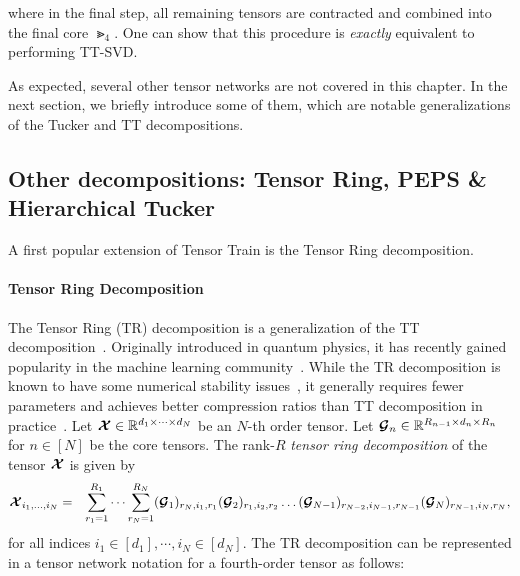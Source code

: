 where in the final step, all remaining tensors are contracted and combined into the final core $\Gt_4$. One can show that this procedure is \emph{exactly} equivalent to performing TT-SVD.

As expected, several other tensor networks are not covered in this chapter. In the next section, we briefly introduce some of them, which are notable generalizations of the Tucker and TT decompositions.
\subsection{Other decompositions: Tensor Ring, PEPS \& Hierarchical Tucker}

A first popular extension of Tensor Train is the Tensor Ring decomposition. 
\paragraph{Tensor Ring Decomposition}
The Tensor Ring (TR) decomposition is a generalization of the TT decomposition~\citep{zhao2016tensor}. Originally introduced in quantum physics, it has recently gained popularity in the machine learning community~\citep{wang2017efficient,wang2018wide,yuan2018higher}. While the TR decomposition is known to have some numerical stability issues~\citep{batselier2018trouble,chen2020tensor}, it generally requires fewer parameters and achieves better compression ratios than TT decomposition in practice~\citep{mickelin2020algorithms}. Let $\bm{\mathcal{X}}\in\mathbb{R}^{d_1\times\dots\times d_N}$
    be an $N$-th order tensor. Let 
    $\bm{\mathcal{G}}_n\in\mathbb{R}^{R_{n-1}\times d_n\times R_n}$ for $n\in[N]$ be the core tensors. 
    The rank-$R$ \emph{tensor ring decomposition} of the tensor $\bm{\mathcal{X}}$ is given by
\begin{align*}
    \bm{\mathcal{X}}_{i_1,\dots,i_N}=\hspace{0.25cm}\sum_{r_1=1}^{R_1}\dots\sum_{r_{N}=1}^{R_N}
    (\bm{\mathcal{G}}_1)_{r_N,i_1,r_1} (\bm{\mathcal{G}}_2)_{ r_1,i_2,r_2}\dots  (\bm{\mathcal{G}}_{N-1})_{r_{N-2},i_{N-1},r_{N-1}} (\bm{\mathcal{G}}_{N})_{r_{N-1},i_{N},r_N},
\end{align*}
for all indices $i_1\in[d_1],\cdots,i_N\in[d_N]$.
The TR decomposition can be represented in a tensor network notation for a fourth-order tensor as follows:
